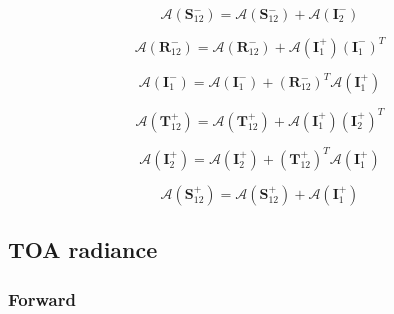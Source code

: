 \begin{equation}
\mathcal{A}(\mathbf{S}^{-}_{12}) = \mathcal{A}(\mathbf{S}^{-}_{12}) + \mathcal{A}(\mathbf{I}^{-}_{2})
\label{eq:radiance-slab_radiance-adjoint_of_tangent_linear-S_m_12_a}
\end{equation}


\begin{equation}
\mathcal{A}(\mathbf{R}^{-}_{12}) = \mathcal{A}(\mathbf{R}^{-}_{12}) + \mathcal{A}(\mathbf{I}^{+}_{1})(\mathbf{I}^{-}_{1})^{T}
\label{eq:radiance-slab_radiance-adjoint_of_tangent_linear-R_m_12_a}
\end{equation}

\begin{equation}
\mathcal{A}(\mathbf{I}^{-}_{1}) = \mathcal{A}(\mathbf{I}^{-}_{1}) + (\mathbf{R}^{-}_{12})^{T}\mathcal{A}(\mathbf{I}^{+}_{1})
\label{eq:radiance-slab_radiance-adjoint_of_tangent_linear-I_m_1_a}
\end{equation}

\begin{equation}
\mathcal{A}(\mathbf{T}^{+}_{12}) = \mathcal{A}(\mathbf{T}^{+}_{12}) + \mathcal{A}(\mathbf{I}^{+}_{1})(\mathbf{I}^{+}_{2})^{T}
\label{eq:radiance-slab_radiance-adjoint_of_tangent_linear-T_p_12_a}
\end{equation}

\begin{equation}
\mathcal{A}(\mathbf{I}^{+}_{2}) = \mathcal{A}(\mathbf{I}^{+}_{2}) + (\mathbf{T}^{+}_{12})^{T}\mathcal{A}(\mathbf{I}^{+}_{1})
\label{eq:radiance-slab_radiance-adjoint_of_tangent_linear-I_p_2_a}
\end{equation}

\begin{equation}
\mathcal{A}(\mathbf{S}^{+}_{12}) = \mathcal{A}(\mathbf{S}^{+}_{12}) + \mathcal{A}(\mathbf{I}^{+}_{1})
\label{eq:radiance-slab_radiance-adjoint_of_tangent_linear-S_p_12_a}
\end{equation}


%
\subsection{TOA radiance}
\label{sec:toa_radiance}

\subsubsection{Forward}
\label{sec:radiance-toa_radiance-forward}


